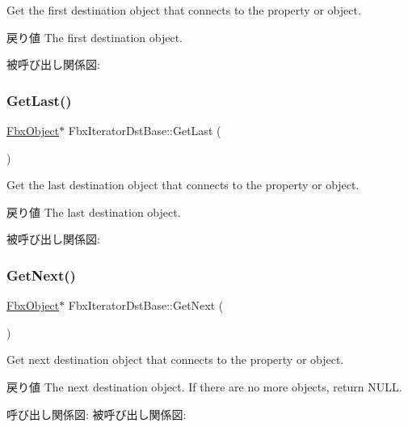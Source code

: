 Get the first destination object that connects to the property or object. \begin{DoxyReturn}{戻り値}
The first destination object. 
\end{DoxyReturn}
被呼び出し関係図\+:
\mbox{\label{class_fbx_iterator_dst_base_a36f14606800603afb3106369d8dec485}} 
\subsubsection{\texorpdfstring{Get\+Last()}{GetLast()}}
{\footnotesize\ttfamily \hyperlink{class_fbx_object}{Fbx\+Object}$\ast$ Fbx\+Iterator\+Dst\+Base\+::\+Get\+Last (\begin{DoxyParamCaption}{ }\end{DoxyParamCaption})}

Get the last destination object that connects to the property or object. \begin{DoxyReturn}{戻り値}
The last destination object. 
\end{DoxyReturn}
被呼び出し関係図\+:
\mbox{\label{class_fbx_iterator_dst_base_ae7b2570f972d09f8e12b2dc22033c90e}} 
\subsubsection{\texorpdfstring{Get\+Next()}{GetNext()}}
{\footnotesize\ttfamily \hyperlink{class_fbx_object}{Fbx\+Object}$\ast$ Fbx\+Iterator\+Dst\+Base\+::\+Get\+Next (\begin{DoxyParamCaption}{ }\end{DoxyParamCaption})}

Get next destination object that connects to the property or object. \begin{DoxyReturn}{戻り値}
The next destination object. If there are no more objects, return N\+U\+LL. 
\end{DoxyReturn}
呼び出し関係図\+:
被呼び出し関係図\+:
\mbox{\label{class_fbx_iterator_dst_base_aa722d332048283c09ba3e690bfe52e14}} 
